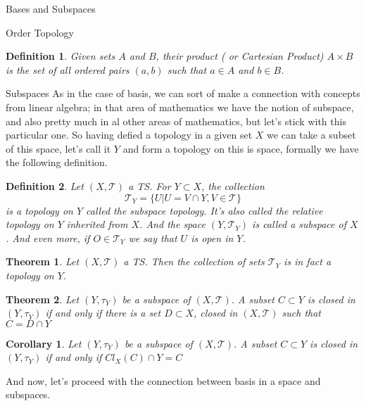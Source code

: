 \documentclass[12pt]{article}
\newtheorem{definition}{Definition}[section]
\newtheorem{theorem}{Theorem}[section]
\newtheorem{corollary}{Corollary}[section]
\begin{document}
\begin{section}{Bases and Subspaces}
\begin{subsection}{Order Topology}
\begin{definition}
Given sets $A$ and $B$, their product ( or Cartesian Product) $A\times B$ is the set of all ordered pairs $(a,b)$ such that $a\in A$ and $b\in B$.
\end{definition}

\end{subsection}

\begin{subsection}{Subspaces}
As in the case of basis, we can sort of make a connection with concepts from linear algebra; in that area of mathematics we have the notion of subspace, and also pretty much in al other areas of mathematics, but let's stick with this particular one. So having defied a topology in a given set $X$ we can take a subset of this space, let's call it $Y$ and form a topology on this is space, formally we have the following definition.

\begin{definition}
Let $\left(X, \mathcal{T}\right)$ a TS. For $Y\subset X$, the collection 
$$
	\mathcal{T}_{Y}=\{ U| U = V \cap Y, V\in \mathcal{T}\}
$$
is a topology on $Y$ called the subspace topology. It's also called the relative topology on $Y$ inherited from $X$. And the space $\left( Y,\mathcal{T}_{Y}\right)$ is called a subspace of $X$. And even more, if $O\in\mathcal{T}_{Y}$ we say that $U$ is open in $Y$.
\end{definition}

\begin{theorem}
Let $\left(X, \mathcal{T}\right)$ a TS. Then the collection of sets $\mathcal{T}_{Y}$ is in fact a topology on $Y$.
\end{theorem}

\begin{theorem}
Let $\left(Y, \tau_{Y} \right)$ be a subspace of $\left(X, \mathcal{T}\right)$. A subset $C\subset Y$ is closed in $\left(Y, \tau_{Y} \right)$ if and only if there is a set $D\subset X$, closed in $\left(X, \mathcal{T}\right)$ such that $C=D\cap Y$
\end{theorem}

\begin{corollary}
Let $\left(Y, \tau_{Y} \right)$ be a subspace of $\left(X, \mathcal{T}\right)$. A subset $C\subset Y$ is closed in $\left(Y, \tau_{Y} \right)$ if and only if $Cl_{X}(C)\cap Y = C$
\end{corollary}

And now, let's proceed with the connection between basis in a space and subspaces.


\end{subsection}
\end{section}
\end{document}

